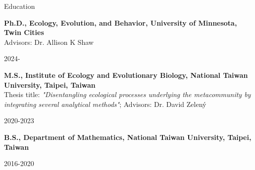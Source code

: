 \documentclass{resume} %
\begin{document}
	
	
	\begin{rSection}{Education}
		
		\begin{minipage}[t]{0.8\textwidth}
			\textbf{Ph.D., Ecology, Evolution, and Behavior, University of Minnesota, Twin Cities}\\
			Advisors: Dr. Allison K Shaw
		\end{minipage}
		\begin{minipage}[t]{0.2\textwidth}
			\hfill {2024-}
		\end{minipage}
		
		\begin{minipage}[t]{0.8\textwidth}
			\textbf{M.S., Institute of Ecology and Evolutionary Biology, National Taiwan University, Taipei, Taiwan}\\
			Thesis title: \textit{"Disentangling ecological processes underlying the metacommunity by integrating several analytical methods"}; Advisors: Dr. David Zelený
		\end{minipage}
		\begin{minipage}[t]{0.2\textwidth}
			\hfill {2020-2023}
		\end{minipage}
		
		\begin{minipage}[t]{0.8\textwidth}
			\textbf{B.S., Department of Mathematics, National Taiwan University, Taipei, Taiwan}
		\end{minipage}
		\begin{minipage}[t]{0.2\textwidth}
			\hfill {2016-2020}
		\end{minipage}
		
		
		
	\end{rSection}
	
\end{document}
